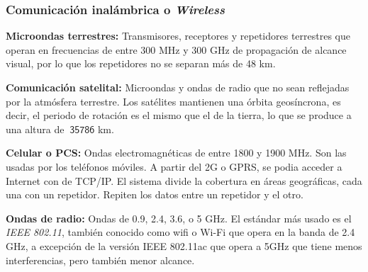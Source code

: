 \subsubsection{Comunicación inalámbrica o \textit{Wireless}}
\begin{description}
\item \textbf{Microondas terrestres:} Transmisores, receptores y repetidores terrestres que operan en frecuencias de entre 300 MHz y 300 GHz de propagación de alcance visual, por lo que los repetidores no se separan más de 48 km.
\item \textbf{Comunicación satelital:} Microondas y ondas de radio que no sean reflejadas por la atmósfera terrestre. Los satélites mantienen una órbita geosíncrona, es decir, el periodo de rotación es el mismo que el de la tierra, lo que se produce a una altura de $\mathsf{~35786}$ km.
\item \textbf{Celular o PCS:} Ondas electromagnéticas de entre 1800 y 1900 MHz. Son las usadas por los teléfonos móviles. A partir del 2G o GPRS, se podia acceder a Internet con de TCP/IP. El sistema divide la cobertura en áreas geográficas, cada una con un repetidor. Repiten los datos entre un repetidor y el otro.
\item \textbf{Ondas de radio:} Ondas de 0.9, 2.4, 3.6, o 5 GHz. El estándar más usado es el \textit{IEEE 802.11}, también conocido como wifi o Wi-Fi que opera en la banda de 2.4 GHz, a excepción de la versión IEEE 802.11ac que opera a 5GHz que tiene menos interferencias, pero también menor alcance.
\end{description}